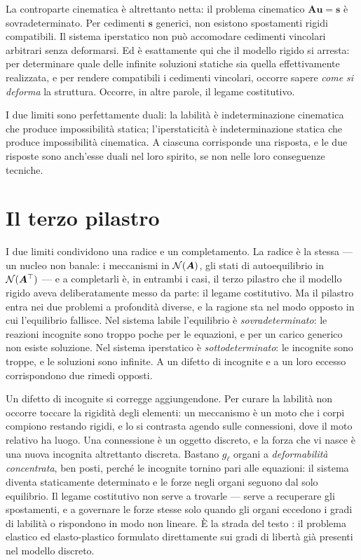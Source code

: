 La controparte cinematica è altrettanto netta: il problema cinematico $\bm{A}\bm{u} = \bm{s}$ è sovradeterminato. Per cedimenti $\bm{s}$ generici, non esistono spostamenti rigidi compatibili. Il sistema iperstatico non può accomodare cedimenti vincolari arbitrari senza deformarsi. Ed è esattamente qui che il modello rigido si arresta: per determinare quale delle infinite soluzioni statiche sia quella effettivamente realizzata, e per rendere compatibili i cedimenti vincolari, occorre sapere \textit{come si deforma} la struttura. Occorre, in altre parole, il legame costitutivo.

I due limiti sono perfettamente duali: la labilità è indeterminazione cinematica che produce impossibilità statica; l'iperstaticità è indeterminazione statica che produce impossibilità cinematica. A ciascuna corrisponde una risposta, e le due risposte sono anch'esse duali nel loro spirito, se non nelle loro conseguenze tecniche.


\section*{Il terzo pilastro}

I due limiti condividono una radice e un completamento. La radice è la stessa --- un nucleo non banale: i meccanismi in $\mathcal{N}(\bm{A})$, gli stati di autoequilibrio in $\mathcal{N}(\bm{A}^\top)$ --- e a completarli è, in entrambi i casi, il terzo pilastro che il modello rigido aveva deliberatamente messo da parte: il legame costitutivo. Ma il pilastro entra nei due problemi a profondità diverse, e la ragione sta nel modo opposto in cui l'equilibrio fallisce. Nel sistema labile l'equilibrio è \textit{sovradeterminato}: le reazioni incognite sono troppo poche per le equazioni, e per un carico generico non esiste soluzione. Nel sistema iperstatico è \textit{sottodeterminato}: le incognite sono troppe, e le soluzioni sono infinite. A un difetto di incognite e a un loro eccesso corrispondono due rimedi opposti.

Un difetto di incognite si corregge aggiungendone. Per curare la labilità non occorre toccare la rigidità degli elementi: un meccanismo è un moto che i corpi compiono restando rigidi, e lo si contrasta agendo sulle connessioni, dove il moto relativo ha luogo. Una connessione è un oggetto discreto, e la forza che vi nasce è una nuova incognita altrettanto discreta. Bastano $g_\ell$ organi a \textit{deformabilità concentrata}, ben posti, perché le incognite tornino pari alle equazioni: il sistema diventa staticamente determinato e le forze negli organi seguono dal solo equilibrio. Il legame costitutivo non serve a trovarle --- serve a recuperare gli spostamenti, e a governare le forze stesse solo quando gli organi eccedono i gradi di labilità o rispondono in modo non lineare. È la strada del testo \cite{LPDN}: il problema elastico ed elasto-plastico formulato direttamente sui gradi di libertà già presenti nel modello discreto.

